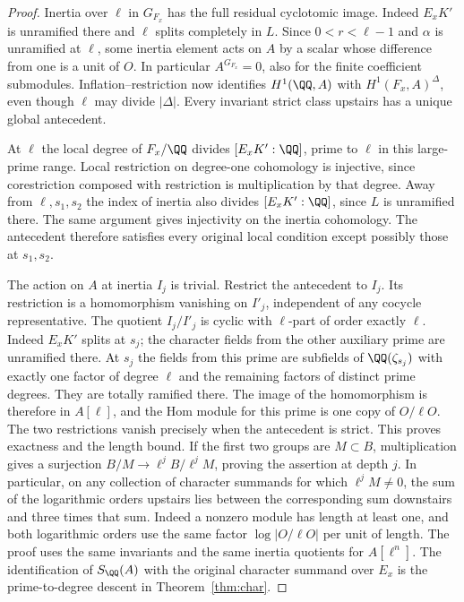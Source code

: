 \documentclass[a4paper,11pt]{article}
\theoremstyle{definition}
\theoremstyle{remark}
\numberwithin{equation}{section}
\begin{document}
\begin{proof}
Inertia over \(\ell\) in \(G_{F_x}\) has the full residual
cyclotomic image. Indeed \(E_xK'\) is unramified there and
\(\ell\) splits completely in \(L\). Since \(0<r<\ell-1\)
and \(\alpha\) is unramified at \(\ell\), some inertia element
acts on \(A\) by a scalar whose difference from one is a unit
of \(O\). In particular \(A^{G_{F_x}}=0\), also for the finite
coefficient submodules. Inflation--restriction now identifies
\(H^1(\QQ,A)\) with \(H^1(F_x,A)^\Delta\), even though
\(\ell\) may divide \(|\Delta|\). Every invariant strict
class upstairs has a unique global antecedent.

At \(\ell\) the local degree of \(F_x/\QQ\) divides
\([E_xK':\QQ]\), prime to \(\ell\) in this large-prime range.
Local restriction on degree-one cohomology is injective, since
corestriction composed with restriction is multiplication by
that degree. Away from \(\ell,s_1,s_2\) the index of inertia
also divides \([E_xK':\QQ]\), since \(L\) is unramified
there. The same argument gives injectivity on the inertia
cohomology. The antecedent therefore satisfies every original
local condition except possibly those at \(s_1,s_2\).

The action on \(A\) at inertia \(I_j\) is trivial. Restrict
the antecedent to \(I_j\). Its restriction is a homomorphism
vanishing on \(I'_j\), independent of any cocycle representative.
The quotient \(I_j/I'_j\) is cyclic with \(\ell\)-part of
order exactly \(\ell\). Indeed \(E_xK'\) splits at \(s_j\);
the character fields from the other auxiliary prime are
unramified there. At \(s_j\) the fields from this prime are
subfields of \(\QQ(\zeta_{s_j})\) with exactly one factor of
degree \(\ell\) and the remaining factors of distinct prime
degrees. They are totally ramified there. The image of the
homomorphism is therefore in \(A[\ell]\), and the Hom module
for this prime is one copy of \(O/\ell O\).
The two restrictions vanish precisely when the antecedent
is strict. This proves exactness and the length bound.
If the first two groups are \(M\subset B\), multiplication gives
a surjection \(B/M\to\ell^jB/\ell^jM\), proving the assertion
at depth \(j\). In particular, on any collection of character
summands for which \(\ell^j M\ne0\), the sum of the logarithmic
orders upstairs lies between the corresponding sum downstairs
and three times that sum. Indeed a nonzero module has length
at least one, and both logarithmic orders use the same factor
\(\log|O/\ell O|\) per unit of length.
The proof uses the same invariants and the same inertia
quotients for \(A[\ell^n]\). The identification of
\(S_{\QQ}(A)\) with the original character summand over \(E_x\)
is the prime-to-degree descent in Theorem~\ref{thm:char}.
\end{proof}
\end{document}
